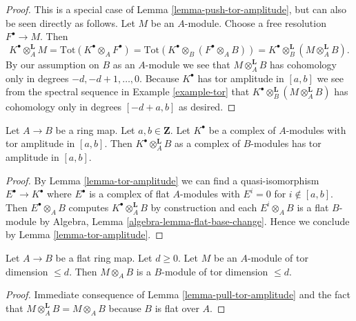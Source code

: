 \begin{proof}
This is a special case of Lemma \ref{lemma-push-tor-amplitude}, but can also
be seen directly as follows.
Let $M$ be an $A$-module. Choose a free resolution $F^\bullet \to M$.
Then
$$
K^\bullet \otimes_A^{\mathbf{L}} M =
\text{Tot}(K^\bullet \otimes_A F^\bullet) =
\text{Tot}(K^\bullet \otimes_B (F^\bullet \otimes_A B)) =
K^\bullet \otimes_B^{\mathbf{L}} (M \otimes_A^{\mathbf{L}} B).
$$
By our assumption on $B$ as an $A$-module we see that
$M \otimes_A^{\mathbf{L}} B$ has cohomology only in degrees
$-d, -d + 1, \ldots, 0$. Because $K^\bullet$ has tor amplitude in
$[a, b]$ we see from the spectral sequence in
Example \ref{example-tor}
that $K^\bullet \otimes_B^{\mathbf{L}} (M \otimes_A^{\mathbf{L}} B)$
has cohomology only in degrees $[-d + a, b]$ as desired.
\end{proof}

\begin{lemma}
\label{lemma-pull-tor-amplitude}
Let $A \to B$ be a ring map.
Let $a, b \in \mathbf{Z}$.
Let $K^\bullet$ be a complex of $A$-modules with tor amplitude in $[a, b]$.
Then $K^\bullet \otimes_A^{\mathbf{L}} B$ as a complex of $B$-modules
has tor amplitude in $[a, b]$.
\end{lemma}

\begin{proof}
By
Lemma \ref{lemma-tor-amplitude}
we can find a quasi-isomorphism $E^\bullet \to K^\bullet$ where
$E^\bullet$ is a complex of flat $A$-modules with $E^i = 0$ for
$i \not \in [a, b]$. Then $E^\bullet \otimes_A B$ computes
$K^\bullet \otimes_A ^{\mathbf{L}} B$ by construction and
each $E^i \otimes_A B$ is a flat $B$-module by
Algebra, Lemma \ref{algebra-lemma-flat-base-change}.
Hence we conclude by
Lemma \ref{lemma-tor-amplitude}.
\end{proof}

\begin{lemma}
\label{lemma-flat-base-change-finite-tor-dimension}
Let $A \to B$ be a flat ring map. Let $d \geq 0$.
Let $M$ be an $A$-module of tor dimension $\leq d$.
Then $M \otimes_A B$ is a $B$-module of tor dimension $\leq d$.
\end{lemma}

\begin{proof}
Immediate consequence of
Lemma \ref{lemma-pull-tor-amplitude}
and the fact that $M \otimes_A^{\mathbf{L}} B = M \otimes_A B$
because $B$ is flat over $A$.
\end{proof}

